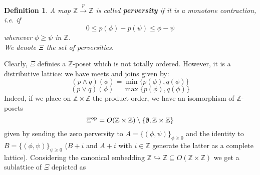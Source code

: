 \documentclass{article}
\newtheorem{defn}[thm]{Definition}
\theoremstyle{definition}
\begin{document}
\begin{defn}
A map $\mathbb{Z} \overset{p}{\longrightarrow} \mathbb{Z}$ is called \textbf{perversity} if it is a monotone contraction, i.e. if $$0 \le p(\phi) - p(\psi) \le \phi - \psi$$ 
whenever $\phi \ge \psi$  in $\mathbb{Z}$. \\
We denote $\Xi$ the set of perversities. 
\end{defn}

Clearly, $\Xi$ definies a $\mathbb{Z}$-poset which is not totally ordered. However, it is a distributive lattice: we have meets and joins given by: $$(p\land q)(\phi)=\min\{p(\phi), q(\phi) \}$$ $$(p\lor q)(\phi)=\max\{p(\phi), q(\phi) \}$$
Indeed, if we place on $\mathbb{Z}\times \mathbb{Z}$ the product order, we have an isomorphism of $\mathbb{Z}$-posets $$\Xi^{\textnormal{op}}=O(\mathbb{Z}\times \mathbb{Z})\setminus \{ \emptyset, \mathbb{Z} \times \mathbb{Z} \} $$
given by sending the zero perversity to $A=\{ (\phi,\psi) \}_{\phi \ge 0} $ and the identity to $B=\{ (\phi,\psi) \}_{\psi \ge 0}$ ($B+i$ and $A+i$ with $i \in \mathbb{Z}$ generate the latter as a complete lattice). Considering the canonical embedding $\mathbb{Z} \hookrightarrow \mathbb{Z}  \subseteq O(\mathbb{Z} \times \mathbb{Z})$ we get a sublattice of $\Xi$ depicted as 
\end{document}

